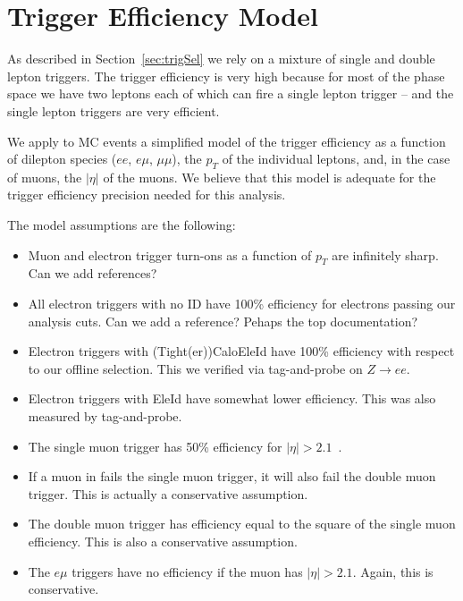 \section{Trigger Efficiency Model}
\label{sec:appendix_trigger}

As described in Section~\ref{sec:trigSel} we rely on a
mixture of single and double lepton triggers.  The trigger
efficiency is very high because for most of the phase space 
we have two leptons each of which can fire a single lepton 
trigger -- and the single lepton triggers are very efficient.

We apply to MC events a simplified model of the trigger efficiency 
as a function of dilepton species ($ee$, $e\mu$, $\mu\mu$), the $p_T$ 
of the individual leptons, and, in the case of muons, the $|\eta|$
of the muons.  We believe that this model is adequate for
the trigger efficiency precision needed for this analysis.

The model assumptions are the following:

\begin{itemize}

\item Muon and electron trigger turn-ons as a function of $p_T$
are infinitely sharp. {\color{red} Can we add references?}

\item All electron triggers with no ID have 100\%
efficiency for electrons passing our analysis cuts. {\color{red}
Can we add a reference?  Pehaps the top documentation?}

\item Electron triggers with (Tight(er))CaloEleId have 100\%
efficiency with respect to our offline selection.  This we 
verified via tag-and-probe on $Z\to ee$.

\item Electron triggers with EleId have somewhat lower
efficiency.  This was also measured by tag-and-probe.

\item The single muon trigger has 50\% efficiency for 
$|\eta|>2.1$~\cite{ref:evans}.

\item If a muon in fails the single muon trigger, it
will also fail the double muon trigger.  This is actually 
a conservative assumption.

\item The double muon trigger has efficiency
equal to the square of the single muon efficiency.  This is
also a conservative assumption.

\item The $e\mu$ triggers have no efficiency if the muon has $|\eta|>2.1$.
Again, this is conservative.
\end{itemize}

